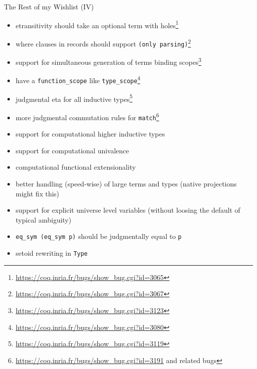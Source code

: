 \documentclass{beamer}
\begin{document}
\begin{frame}{The Rest of my Wishlist (IV)}
\begin{itemize}
  \item 
    etransitivity should take an optional term with holes\footnote{\url{https://coq.inria.fr/bugs/show\_bug.cgi?id=3065}}
  \item 
    where clauses in records should support \texttt{(only parsing)}\footnote{\url{https://coq.inria.fr/bugs/show\_bug.cgi?id=3067}}
  \item 
    support for simultaneous generation of terms binding scopes\footnote{\url{https://coq.inria.fr/bugs/show\_bug.cgi?id=3123}}
  \item 
    have a \texttt{function\_scope} like \texttt{type\_scope}\footnote{\url{https://coq.inria.fr/bugs/show\_bug.cgi?id=3080}}
  \item 
    judgmental eta for all inductive types\footnote{\url{https://coq.inria.fr/bugs/show\_bug.cgi?id=3119}}
  \item 
    more judgmental commutation rules for \texttt{match}\footnote{\url{https://coq.inria.fr/bugs/show\_bug.cgi?id=3191} and related bugs}
  \item 
    support for computational higher inductive types
  \item 
    support for computational univalence
  \item 
    computational functional extensionality
  \item 
    better handling (speed-wise) of large terms and types (native projections might fix this)
  \item 
    support for explicit universe level variables (without loosing the default of typical ambiguity)
  \item 
    \texttt{eq\_sym (eq\_sym p)} should be judgmentally equal to \texttt{p}
  \item 
    setoid rewriting in \texttt{Type}
\end{itemize}
\end{frame}
\end{document}
